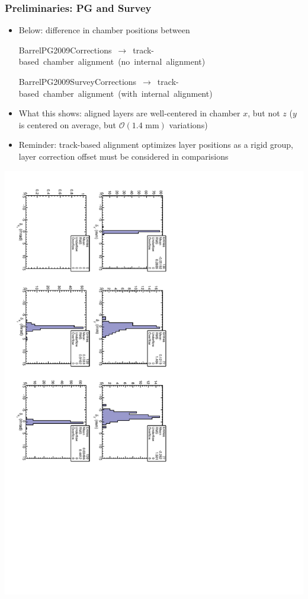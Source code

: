 \documentclass[compress]{beamer}
\begin{document}
\begin{frame}
\frametitle{Preliminaries: PG and Survey}
\begin{itemize}
\item Below: difference in chamber positions between

\hspace{-1.25 cm}\mbox{\scriptsize BarrelPG2009Corrections $\to$ track-based chamber alignment (no internal alignment)}

\hspace{-1.25 cm}\mbox{\scriptsize BarrelPG2009SurveyCorrections $\to$ track-based chamber alignment (with internal alignment)\hspace{-1 cm}}

\item What this shows: aligned layers are well-centered in chamber $x$, but not $z$ ($y$ is centered on average, but $\mathcal{O}(\mbox{1.4 mm})$ variations)

\item Reminder: track-based alignment optimizes layer positions as a rigid group, layer correction offset must be considered in comparisions
\end{itemize}

\centering
\includegraphics[height=0.85\linewidth, angle=90]{diff_pgonly-pgsurvey.pdf}
\end{frame}
\end{document}
